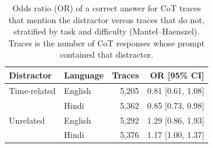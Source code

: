 \begin{table}[ht]
\centering
\small
\begin{tabular}{llrr}
\toprule
Distractor & Language & Traces & OR [95\% CI] \\
\midrule
Time-related & English & 5,205 & 0.81 [0.61, 1.08] \\
 & Hindi & 5,362 & 0.85 [0.73, 0.98] \\
\midrule
Unrelated & English & 5,292 & 1.29 [0.86, 1.93] \\
 & Hindi & 5,376 & 1.17 [1.00, 1.37] \\
\bottomrule
\end{tabular}
\caption{Odds ratio (OR) of a correct answer for CoT traces that mention the distractor versus traces that do not, stratified by task and difficulty (Mantel--Haenszel). Traces is the number of CoT responses whose prompt contained that distractor.}
\label{tab:mention-or}
\end{table}
